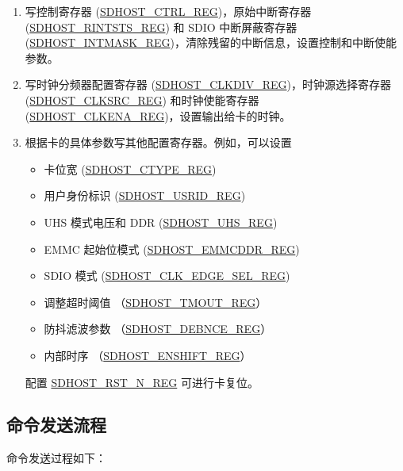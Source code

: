 \documentclass[main\_\_CN.tex]{subfiles}
\begin{document}
\begin{enumerate}
\item 写控制寄存器 (\hyperref[regdesc:SDHOSTCTRLREG]{SDHOST\_CTRL\_REG})，原始中断寄存器 (\hyperref[regdesc:SDHOSTRINTSTSREG]{SDHOST\_RINTSTS\_REG}) 和 SDIO 中断屏蔽寄存器 (\hyperref[regdesc:SDHOSTINTMASKREG]{SDHOST\_INTMASK\_REG})，清除残留的中断信息，设置控制和中断使能参数。
\item 写时钟分频器配置寄存器 (\hyperref[regdesc:SDHOSTCLKDIVREG]{SDHOST\_CLKDIV\_REG})，时钟源选择寄存器 (\hyperref[fielddesc:SDHOSTCLKSRCREG]{\hyperref[regdesc:SDHOSTCLKSRCREG]{SDHOST\_CLKSRC\_REG}}) 和时钟使能寄存器 (\hyperref[regdesc:SDHOSTCLKENAREG]{SDHOST\_CLKENA\_REG})，设置输出给卡的时钟。
\item 根据卡的具体参数写其他配置寄存器。例如，可以设置
    \begin{itemize}
    \item 卡位宽 (\hyperref[regdesc:SDHOSTCTYPEREG]{SDHOST\_CTYPE\_REG})
    \item 用户身份标识 (\hyperref[fielddesc:SDHOSTUSRIDREG]{\hyperref[regdesc:SDHOSTUSRIDREG]{SDHOST\_USRID\_REG}})
    \item UHS 模式电压和 DDR (\hyperref[regdesc:SDHOSTUHSREG]{SDHOST\_UHS\_REG})
    \item EMMC 起始位模式 (\hyperref[regdesc:SDHOSTEMMCDDRREG]{SDHOST\_EMMCDDR\_REG})
    \item SDIO 模式 (\hyperref[regdesc:SDHOSTCLKEDGESELREG]{SDHOST\_CLK\_EDGE\_SEL\_REG})
    \item 调整超时阈值 （\hyperref[regdesc:SDHOSTTMOUTREG]{SDHOST\_TMOUT\_REG}）
    \item 防抖滤波参数 （\hyperref[regdesc:SDHOSTDEBNCEREG]{SDHOST\_DEBNCE\_REG}）
    \item 内部时序 （\hyperref[regdesc:SDHOSTENSHIFTREG]{SDHOST\_ENSHIFT\_REG}）
    \end{itemize}
    配置 \hyperref[regdesc:SDHOSTRSTNREG]{SDHOST\_RST\_N\_REG} 可进行卡复位。
\end{enumerate}

\subsection{命令发送流程}

命令发送过程如下：
\end{document}
